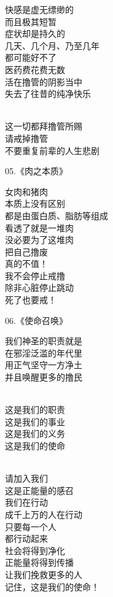 \begin{multicols}{2}
\begin{center}
        快感是虚无缥缈的 \\ 而且极其短暂 \\ 症状却是持久的 \\ 几天、几个月、乃至几年 \\ 都可能好不了 \\ 医药费花费无数 \\ 活在撸管的阴影当中 \\ 失去了往昔的纯净快乐

        ~\\

        这一切都拜撸管所赐 \\ 请戒掉撸管 \\ 不要重复前辈的人生悲剧
    \end{center}

    \begin{center}
        05.《肉之本质》\it

        女肉和猪肉 \\ 本质上没有区别 \\ 都是由蛋白质、脂肪等组成 \\ 看透了就是一堆肉 \\ 没必要为了这堆肉 \\ 把自己撸废 \\ 真的不值！ \\ 我不会停止戒撸 \\ 除非心脏停止跳动 \\ 死了也要戒！
    \end{center}

    \begin{center}
        06.《使命召唤》\it

        我们神圣的职责就是 \\ 在邪淫泛滥的年代里 \\ 用正气坚守一方净土 \\ 并且唤醒更多的撸民

        ~\\

        这是我们的职责 \\ 这是我们的事业 \\ 这是我们的义务 \\ 这是我们的使命

        ~\\

        请加入我们 \\ 这是正能量的感召 \\ 我们在行动 \\ 成千上万的人在行动 \\ 只要每一个人 \\ 都行动起来 \\ 社会将得到净化 \\ 正能量将得到传播 \\ 让我们挽救更多的人 \\ 记住，这是我们的使命！
    \end{center}
\end{multicols}

